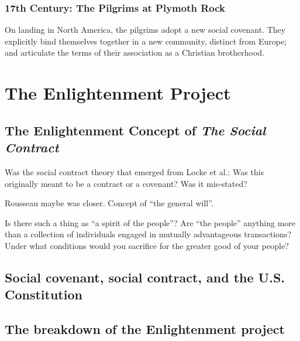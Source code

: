 \documentclass[
]{book}
\begin{document}
\hypertarget{th-century-the-pilgrims-at-plymoth-rock}{%
\section{17th Century: The Pilgrims at Plymoth Rock}\label{th-century-the-pilgrims-at-plymoth-rock}}

On landing in North America, the pilgrims adopt a new social covenant. They explicitly bind themselves together in a new community, distinct from Europe; and articulate the terms of their association as a Christian brotherhood.

\hypertarget{part-the-enlightenment-project}{%
\part{The Enlightenment Project}\label{part-the-enlightenment-project}}

\hypertarget{the-enlightenment-concept-of-the-social-contract}{%
\chapter{\texorpdfstring{The Enlightenment Concept of \emph{The Social Contract}}{The Enlightenment Concept of The Social Contract}}\label{the-enlightenment-concept-of-the-social-contract}}

Was the social contract theory that emerged from Locke et al.: Was this
originally meant to be a contract or a covenant? Was it mis-stated?

Rousseau maybe was closer. Concept of ``the general will''.

Is there such a thing as ``a spirit of the people''?
Are ``the people'' anything more than a collection of individuals engaged in mutually advantageous transactions?
Under what conditions would you sacrifice for the greater good of your people?

\hypertarget{social-covenant-social-contract-and-the-u.s.-constitution}{%
\chapter{Social covenant, social contract, and the U.S. Constitution}\label{social-covenant-social-contract-and-the-u.s.-constitution}}

\hypertarget{the-breakdown-of-the-enlightenment-project}{%
\chapter{The breakdown of the Enlightenment project}\label{the-breakdown-of-the-enlightenment-project}}
\end{document}
